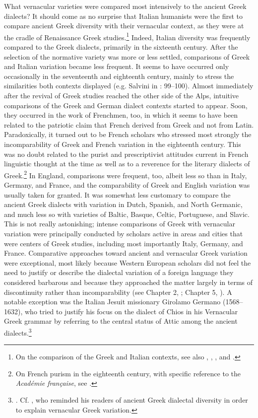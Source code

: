 What vernacular varieties were compared most intensively to the ancient Greek dialects? It should come as no surprise that Italian humanists were the first to compare ancient Greek diversity with their vernacular context, as they were at the cradle of Renaissance Greek studies.\footnote{On the comparison of the Greek and Italian contexts, see also \citet[2–3, 51]{Dionisotti1968}, \citet[179]{Alinei1984}, \citet[215]{Trovato1984}, and \citet[36--37]{Lepschy2002}.} Indeed, Italian diversity was frequently compared to the Greek dialects, primarily in the sixteenth century. After the selection of the normative variety was more or less settled, comparisons of Greek and Italian variation became less frequent. It seems to have occurred only occasionally in the seventeenth and eighteenth century, mainly to stress the similarities both contexts displayed (e.g. Salvini in \citealt{Muratori1724}: 99–100). Almost immediately after the revival of Greek studies reached the other side of the Alps, intuitive comparisons of the Greek and German dialect contexts started to appear. Soon, they occurred in the work of Frenchmen, too, in which it seems to have been related to the patriotic claim that French derived from Greek and not from Latin. Paradoxically, it turned out to be French scholars who stressed most strongly the incomparability of Greek and French variation in the eighteenth century. This was no doubt related to the purist and prescriptivist attitudes current in French linguistic thought at the time as well as to a reverence for the literary dialects of Greek.\footnote{On French purism in the eighteenth century, with specific reference to the \textit{Académie française}, see \citet[]{Francois1905}.} In England, comparisons were frequent, too, albeit less so than in Italy, Germany, and France, and the comparability of Greek and English variation was usually taken for granted. It was somewhat less customary to compare the ancient Greek dialects with variation in Dutch, Spanish, and North Germanic, and much less so with varieties of Baltic, Basque, Celtic, Portuguese, and Slavic. This is not really astonishing; intense comparisons of Greek with vernacular variation were principally conducted by scholars active in areas and cities that were centers of Greek studies, including most importantly Italy, Germany, and France. Comparative approaches toward ancient and vernacular Greek variation were exceptional, most likely because Western European scholars did not feel the need to justify or describe the dialectal variation of a foreign language they considered barbarous and because they approached the matter largely in terms of discontinuity rather than incomparability (see Chapter 2, ; Chapter 5, ). A notable exception was the Italian Jesuit missionary Girolamo Germano (1568–1632), who tried to justify his focus on the dialect of Chios in his Vernacular Greek grammar by referring to the central status of Attic among the ancient dialects.\footnote{\citet[10]{Germano1622}. Cf. \citet[vi-vii]{Du1688}, who reminded his readers of ancient Greek dialectal diversity in order to explain vernacular Greek variation.}

